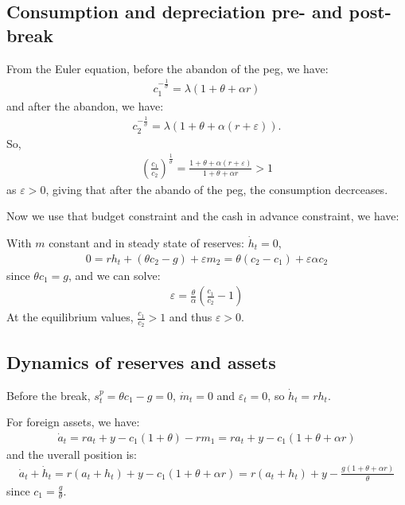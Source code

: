 \documentclass[a4paper,12pt]{article} %
\theoremstyle{nonitalic}
\begin{document}
\subsection{Consumption and depreciation pre- and post-break}\label{sec:1.3}
From the Euler equation, before the abandon of the peg, we have:
\begin{gather*}
    c_1^{-\frac{1}{\sigma}} = \lambda (1 + \theta + \alpha r)
\end{gather*}
and after the abandon, we have:
\begin{gather*}
    c_2^{-\frac{1}{\sigma}} = \lambda (1 + \theta + \alpha (r+\varepsilon)).
\end{gather*}
So,
\begin{gather*}
    \left(\frac{c_1}{c_2}\right)^{\frac{1}{\sigma}} = \frac{1+\theta + \alpha (r+\varepsilon)}{1 + \theta + \alpha r} > 1
\end{gather*}
as $\varepsilon > 0$, giving that after the abando of the peg, the consumption decrceases.

Now we use that budget constraint and the cash in advance constraint, we have:

With $m$ constant and in steady state of reserves: $\dot{h}_t = 0$,
\begin{gather*}
    0 = r h_t + (\theta c_2 - g) + \varepsilon m_2 = \theta (c_2 - c_1 ) + \varepsilon \alpha c_2
\end{gather*}
since $\theta c_1 = g$, and we can solve:
\begin{gather*}
    \varepsilon  = \frac{\theta}{\alpha} \left( \frac{c_1}{c_2} - 1 \right)
\end{gather*}
At the equilibrium values, $\frac{c_1}{c_2} > 1$ and thus $\varepsilon > 0$.


\subsection{Dynamics of reserves and assets}\label{sec:1.4}
Before the break, $s_t^p = \theta c_1 - g = 0$, $\dot{m}_t = 0$ and $\varepsilon_t = 0$, so $\dot{h}_t = r h_t$.

For foreign assets, we have:
\begin{gather*}
    \dot{a}_t = r a_t + y - c_1(1+\theta) - r m_1 = r a_t + y - c_1 (1 + \theta + \alpha r)
\end{gather*}
and the uverall position is:
\begin{gather*}
    \dot{a}_t + \dot{h}_t = r(a_t + h_t) + y - c_1(1 + \theta + \alpha r) = r(a_t + h_t) + y - \frac{g (1 + \theta + \alpha r)}{\theta}
\end{gather*}
since $c_1 = \frac{g}{\theta}$.
\end{document}
